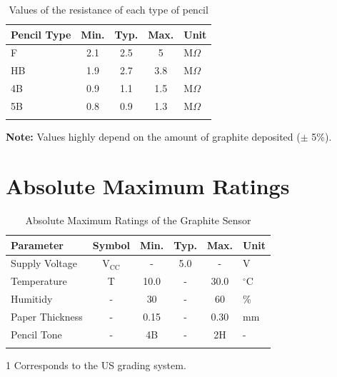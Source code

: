 \documentclass[10pt]{datasheet}
\begin{document}
\begin{table}[h]
\begin{threeparttable}
\caption{Values of the resistance of each type of pencil}
\begin{tabularx}{\textwidth}{l | c | c | c | X}
    \thickhline
    \textbf{Pencil Type} & \textbf{Min.} & \textbf{Typ.} & \textbf{Max.} &
    \textbf{Unit} \\
    \hline
    F  & 2.1 & 2.5 & 5 & $\text{M}\Omega$ \\    %
    HB & 1.9 & 2.7 & 3.8 & $\text{M}\Omega$ \\  %
    4B & 0.9 & 1.1 & 1.5 & $\text{M}\Omega$ \\  %
    5B & 0.8 & 0.9 & 1.3 & $\text{M}\Omega$ \\  %
    \thickhline
\end{tabularx}
\end{threeparttable}
\end{table}

\textbf{Note:} Values highly depend on the amount of graphite deposited ($\pm$ 5\%). 

\section{Absolute Maximum Ratings}

\begin{table}[h!]
\begin{threeparttable}
\caption{Absolute Maximum Ratings of the Graphite Sensor}
\begin{tabularx}{\textwidth}{l | c | c c c | X}
    \thickhline
    \textbf{Parameter} & \textbf{Symbol} & \textbf{Min.} & \textbf{Typ.} & \textbf{Max.} & \textbf{Unit} \\
    \hline
    Supply Voltage & V$_{\text{CC}}$ & - & 5.0 & - & V \\
    \hline
    Temperature & T & 10.0 & - & 30.0 & $^\circ$C \\
    Humitidy & - & 30 & - & 60 & \% \\
    \hline
    Paper Thickness & - & 0.15 & - & 0.30 & mm \\
    Pencil Tone\tnote{1} & - & 4B & - & 2H & - \\
    \thickhline
\end{tabularx}
\begin{tablenotes}
\item[1]{Corresponds to the US grading system.}
\end{tablenotes}
\end{threeparttable}
\end{table}
\end{document}

